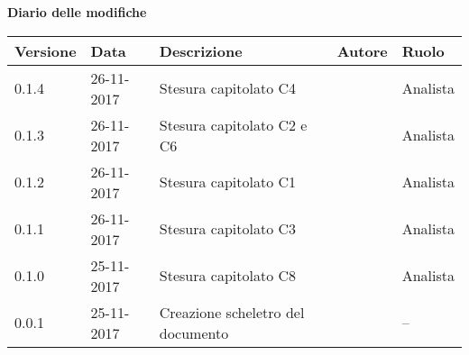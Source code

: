 \documentclass[StudioDiFattibilità.tex]{subfiles}
\begin{document}
\huge \bfseries Diario delle modifiche\\
\begin{table}[htbp]
	\centering
	\renewcommand\arraystretch{1.2}

	\begin{tabularx}{\textwidth}{p{2cm}|p{2cm}|p{4cm}|p{2cm}|p{3cm}}
		\hline
		\textbf{Versione} & \textbf{Data} & \textbf{Descrizione} & \textbf{Autore} & \textbf{Ruolo}\\

		\hline
		0.1.4 & 26-11-2017 & Stesura capitolato C4 & \Valentina & Analista\\
		
		\hline
		0.1.3 & 26-11-2017 & Stesura capitolato C2 e C6 & \Mirco & Analista \\

		\hline
		0.1.2 & 26-11-2017 & Stesura capitolato C1 & \Riccardo & Analista \\
		
		\hline
		0.1.1 & 26-11-2017 & Stesura capitolato C3 & \Davide & Analista \\
		
		\hline
		0.1.0 & 25-11-2017 & Stesura capitolato C8 & \Elena & Analista \\
		
		\hline
		0.0.1 & 25-11-2017 & Creazione scheletro del documento & \Valentina & -- \\
		\hline
	
	\end{tabularx}

\end{table}
\end{document}
